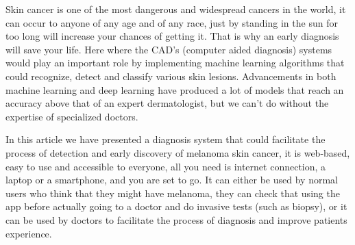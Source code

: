 Skin cancer is one of the most dangerous and widespread cancers in the world, it can occur to anyone of any age and of any race, just by standing in the sun for too long will increase your chances of getting it. That is why an early diagnosis will save your life. Here where the CAD's (computer aided diagnosis) systems would play an important role by implementing machine learning algorithms that could recognize, detect and classify various skin lesions. Advancements in both machine learning and deep learning have produced a lot of models that reach an accuracy above that of an expert dermatologist, but we can't do without the expertise of specialized doctors.

In this article we have presented a diagnosis system that could facilitate the process of detection and early discovery of melanoma skin cancer, it is web-based, easy to use and accessible to everyone, all you need is internet connection, a laptop or a smartphone, and you are set to go. It can either be used by normal users who think that they might have melanoma, they can check that using the app before actually going to a doctor and do invasive tests (such as biopsy), or it can be used by doctors to facilitate the process of diagnosis and improve patients experience.






